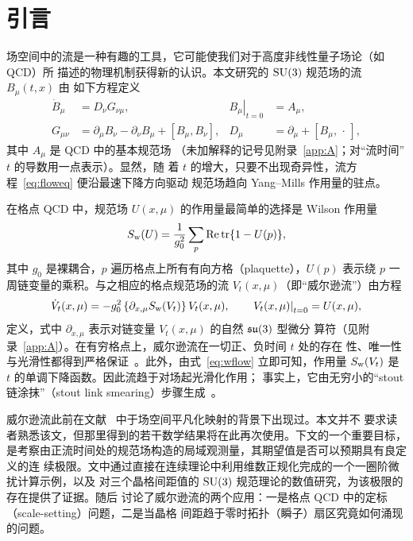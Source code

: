 \section{引言}

场空间中的流是一种有趣的工具，它可能使我们对于高度非线性量子场论（如 QCD）所
描述的物理机制获得新的认识。本文研究的 $\mathrm{SU(3)}$ 规范场的流 $B_{\mu}(t,x)$ 由
如下方程定义
\begin{align}
  \dot{B}_{\mu} &= D_{\nu}G_{\nu\mu},
  &
  \left.B_{\mu}\right|_{t=0} &= A_{\mu},
  \label{eq:floweq}\\
  G_{\mu\nu} &= \partial_{\mu}B_{\nu}-\partial_{\nu}B_{\mu}
  +[B_{\mu},B_{\nu}],
  &
  D_{\mu} &= \partial_{\mu}+[B_{\mu},\,\cdot\,],
\end{align}
其中 $A_{\mu}$ 是 QCD 中的基本规范场
（未加解释的记号见附录~\ref{app:A}；对“流时间”$t$ 的导数用一点表示）。显然，随
着 $t$ 的增大，只要不出现奇异性，流方程~\eqref{eq:floweq} 便沿最速下降方向驱动
规范场趋向 Yang--Mills 作用量的驻点。

在格点 QCD 中，规范场 $U(x,\mu)$ 的作用量最简单的选择是 Wilson
作用量~\cite{Wilson}
\begin{equation}
  S_{\mathrm{w}}(U)=\frac{1}{g_0^2}\sum_p
  \mathrm{Re}\,\mathrm{tr}\{1-U(p)\},
  \label{eq:wact}
\end{equation}
其中 $g_0$ 是裸耦合，$p$ 遍历格点上所有有向方格（plaquette），$U(p)$ 表示绕 $p$
一周链变量的乘积。与之相应的格点规范场的流 $V_t(x,\mu)$（即“威尔逊流”）由方程
\begin{equation}
  \dot{V}_t(x,\mu)=-g_0^2\left\{\partial_{x,\mu}S_{\mathrm{w}}(V_t)\right\}V_t(x,\mu),
  \qquad
  \left.V_t(x,\mu)\right|_{t=0}=U(x,\mu),
  \label{eq:wflow}
\end{equation}
定义，式中 $\partial_{x,\mu}$ 表示对链变量 $V_t(x,\mu)$ 的自然 $\mathfrak{su}(3)$ 型微分
算符（见附录~\ref{app:A}）。在有穷格点上，威尔逊流在一切正、负时间 $t$ 处的存在
性、唯一性与光滑性都得到严格保证~\cite{ArnoldI}。此外，由式~\eqref{eq:wflow}
立即可知，作用量 $S_{\mathrm{w}}(V_t)$ 是 $t$ 的单调下降函数。因此流趋于对场起光滑化作用；
事实上，它由无穷小的“stout 链涂抹”（stout link smearing）步骤生成~\cite{Stout}。

威尔逊流此前在文献~\cite{TrivMaps} 中于场空间平凡化映射的背景下出现过。本文并不
要求读者熟悉该文，但那里得到的若干数学结果将在此再次使用。下文的一个重要目标，
是考察由正流时间处的规范场构造的局域观测量，其期望值是否可以预期具有良定义的连
续极限。文中通过直接在连续理论中利用维数正规化完成的一个一圈阶微扰计算示例，以及
对三个晶格间距值的 $\mathrm{SU(3)}$ 规范理论的数值研究，为该极限的存在提供了证据。随后
讨论了威尔逊流的两个应用：一是格点 QCD 中的定标（scale-setting）问题，二是当晶格
间距趋于零时拓扑（瞬子）扇区究竟如何涌现的问题。
